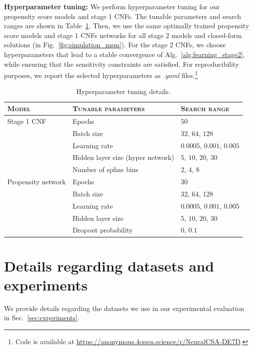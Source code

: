 \documentclass{article} %
\theoremstyle{definition}
\theoremstyle{plain}
\begin{document}
\textbf{Hyperparameter tuning:}
We perform hyperparameter tuning for our propensity score models and stage 1 CNFs. The tunable parameters and search ranges are shown in Table~\ref{tab:hyper}. Then, we use the same optimally trained propensity score models and stage 1 CNFs networks for all stage 2 models and closed-form solutions (in Fig.~\ref{fig:simulation_msm}). For the stage 2 CNFs, we choose hyperparameters that lead to a stable convergence of Alg.~\ref{alg:learning_stage2}, while ensuring that the sensitivity constraints are satisfied. For reproducibility purposes, we report the selected hyperparameters as \emph{.yaml} files.\footnote{Code is available at \href{https://anonymous.4open.science/r/NeuralCSA-DE7D}{https://anonymous.4open.science/r/NeuralCSA-DE7D}.}

\begin{table}[h]
\caption{Hyperparameter tuning details.}
\centering
\label{tab:hyper}
\footnotesize
\begin{tabular}{lll}
\toprule
\textsc{Model} & \textsc{Tunable parameters} & \textsc{Search range} \\
\midrule
Stage 1 CNF &Epochs & $50$ \\
&Batch size &$32$, $64$, $128$  \\
 & Learning rate & $0.0005$, $0.001$, $0.005$\\
 & Hidden layer size (hyper network) & $5$, $10$, $20$, $30$\\
  & Number of spline bins & $2$, $4$, $8$ \\
 
\midrule
Propensity network & Epochs & $30$ \\
&Batch size &$32$, $64$, $128$  \\
& Learning rate & $0.0005$, $0.001$, $0.005$ \\
 & Hidden layer size  & $5$, $10$, $20$, $30$ \\
  & Dropout probability & $0$, $0.1$\\
\bottomrule
\end{tabular}
\end{table}

\clearpage

\section{Details regarding datasets and experiments}\label{app:details_exp}

We provide details regarding the datasets we use in our experimental evaluation in Sec.~\ref{sec:experiments}.
\end{document}
